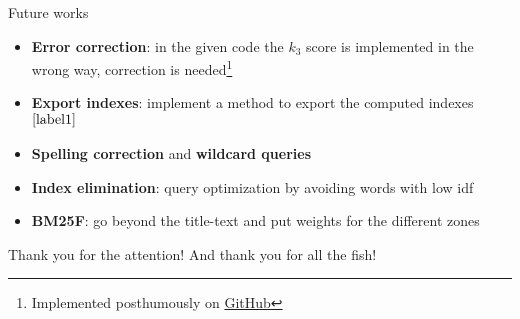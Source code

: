 \documentclass[]{beamer}
\begin{document}
\appendix
\begin{frame}{Future works}
    \begin{itemize}
        \item \textbf{Error correction}: in the given code the $k_3$ score is implemented in the wrong way,
        correction is needed\footnote{\label{label1}Implemented posthumously on \href{https://github.com/abarbieri98/Information-Retrieval---Final-Project}{GitHub}}
        \item \textbf{Export indexes}: implement a method to export the computed indexes$^{\ref{label1}}$
        \item \textbf{Spelling correction} and \textbf{wildcard queries}
        \item \textbf{Index elimination}: query optimization by avoiding words with low idf
        \item \textbf{BM25F}: go beyond the title-text and put weights for the different zones
    \end{itemize}
\end{frame}
\begin{frame}
    \centering
    \huge{Thank you for the attention!}
    \vfill
    \small{And thank you for all the fish!}
\end{frame}
\end{document}

